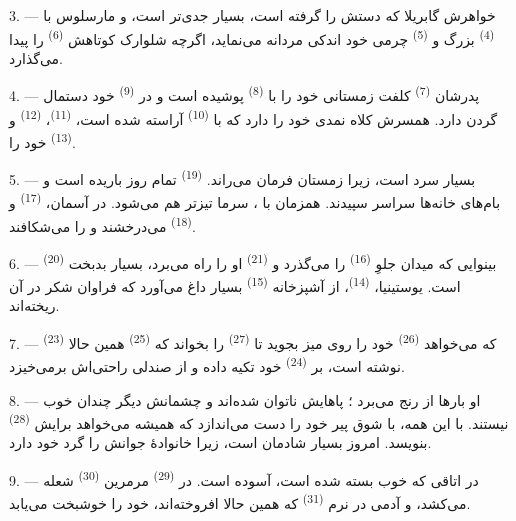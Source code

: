 3. --- خواهرش گابریلا که دستش را گرفته است، بسیار جدی‌تر است، و
مارسلوس با  \textsuperscript{(4)} بزرگ و
 \textsuperscript{(5)} چرمی خود اندکی مردانه می‌نماید،
اگرچه شلوارک کوتاهش  \textsuperscript{(6)} را
پیدا می‌گذارد.

4. --- پدرشان  \textsuperscript{(7)} کلفت زمستانی
خود را با  \textsuperscript{(8)} پوشیده است و در
 \textsuperscript{(9)} خود دستمال گردن دارد. همسرش کلاه
نمدی خود را دارد که با  \textsuperscript{(10)} آراسته شده
است،  \textsuperscript{(11)}، 
\textsuperscript{(12)} و  \textsuperscript{(13)} خود
را.

5. --- بسیار سرد است، زیرا زمستان فرمان می‌راند. 
\textsuperscript{(19)} تمام روز باریده است و بام‌های خانه‌ها سراسر
سپیدند. همزمان با ، سرما تیزتر هم می‌شود. در آسمان،
 \textsuperscript{(17)} و 
\textsuperscript{(18)} می‌درخشند و  را می‌شکافند.

\VUsaut{4.2mm}
\VUsaut{3.0mm}

6. ---  \textsuperscript{(20)} بینوایی که میدان جلوِ
 \textsuperscript{(16)} را می‌گذرد و  \textsuperscript{(21)} او را راه می‌برد، بسیار بدبخت است.
یوستینیا،  \textsuperscript{(14)}، از آشپزخانه
 \textsuperscript{(15)}  بسیار داغ
می‌آورد که فراوان شکر در آن ریخته‌اند.

7. ---  \textsuperscript{(23)} که می‌خواهد
 \textsuperscript{(26)} خود را روی میز بجوید تا
 \textsuperscript{(27)} را بخواند که 
\textsuperscript{(25)} همین حالا نوشته است، بر 
\textsuperscript{(24)} خود تکیه داده و از صندلی راحتی‌اش برمی‌خیزد.

8. --- او بارها از  رنج می‌برد ؛ پاهایش ناتوان شده‌اند و چشمانش دیگر چندان خوب نیستند.
با این همه، با شوق  پیر خود را دست می‌اندازد که همیشه
می‌خواهد برایش  \textsuperscript{(28)} بنویسد. امروز
بسیار شادمان است، زیرا خانوادهٔ جوانش را گرد خود دارد.

9. --- در اتاقی که خوب بسته شده است، آسوده است. در  \textsuperscript{(29)} مرمرین 
\textsuperscript{(30)} شعله می‌کشد، و آدمی در  نرم
 \textsuperscript{(31)} که همین حالا افروخته‌اند، خود را
خوشبخت می‌یابد.

